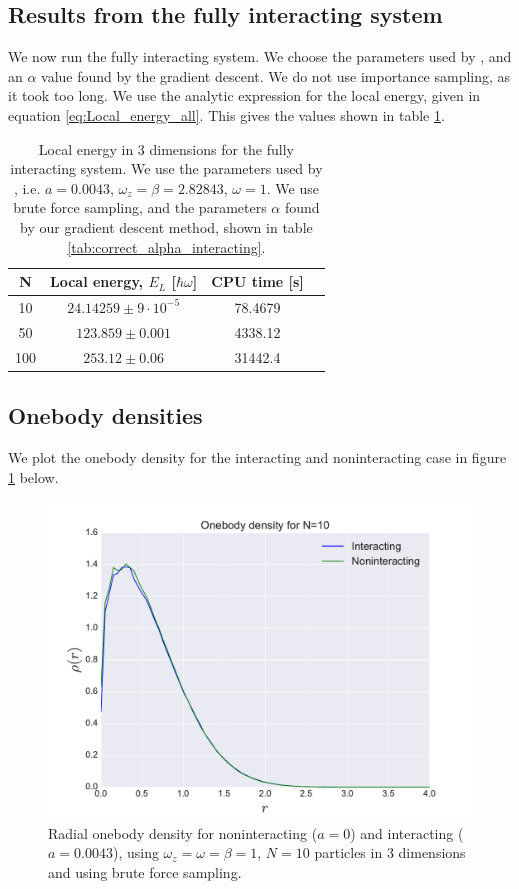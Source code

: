 \documentclass[a4paper, 10pt]{article}
\begin{document}
	\subsection{Results from the fully interacting system}
	We now run the fully interacting system. We choose the parameters used by \cite{Nilsen2005}, and an $\alpha$ value found by the gradient descent. We do not use importance sampling, as it took too long. We use the analytic expression for the local energy, given in equation \ref{eq:Local_energy_all}. This gives the values shown in table \ref{tab:fully_interacting_system}.
	\begin{table}[ht!]
		\centering
		\begin{tabular}{cccc}
			N & Local energy, $E_L$ [$\hbar \omega$] & CPU time [s]\\
			\hline
			10 & $24.14259\pm 9\cdot 10^{-5}$ & 78.4679\\
			50 & $123.859\pm 0.001$ & 4338.12\\
			100 & $253.12 \pm 0.06$ & 31442.4\\
		\end{tabular}
		\caption{Local energy in 3 dimensions for the fully interacting system. We use the parameters used by \cite{Nilsen2005}, i.e. $a=0.0043$, $\omega_z=\beta=2.82843$, $\omega=1$. We use brute force sampling, and the parameters $\alpha$ found by our gradient descent method, shown in table \ref{tab:correct_alpha_interacting}.}\label{tab:fully_interacting_system}
	\end{table}
	\subsection{Onebody densities}
	We plot the onebody density for the interacting and noninteracting case in figure \ref{fig:results_onebody} below.
		\begin{figure}[ht!]
			\centering
			\includegraphics[scale=0.8]{../Results/onbody.pdf}
			\caption{Radial onebody density for noninteracting ($a=0$) and interacting ($a=0.0043$), using $\omega_z=\omega=\beta=1$, $N=10$ particles in $3$ dimensions and using brute force sampling.}\label{fig:results_onebody}
		\end{figure}
\end{document}
